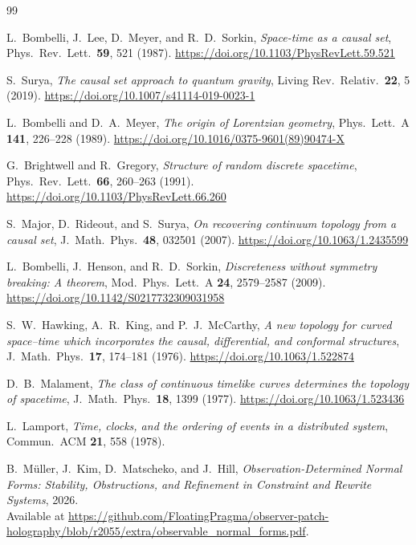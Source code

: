 \documentclass[11pt]{article}
\theoremstyle{remark}
\theoremstyle{plain}
\begin{document}
\begin{thebibliography}{99}

L.~Bombelli, J.~Lee, D.~Meyer, and R.~D.~Sorkin,
\emph{Space-time as a causal set},
Phys.\ Rev.\ Lett.\ \textbf{59}, 521 (1987).
\url{https://doi.org/10.1103/PhysRevLett.59.521}

S.~Surya,
\emph{The causal set approach to quantum gravity},
Living Rev.\ Relativ.\ \textbf{22}, 5 (2019).
\url{https://doi.org/10.1007/s41114-019-0023-1}

L.~Bombelli and D.~A.~Meyer,
\emph{The origin of Lorentzian geometry},
Phys.\ Lett.\ A \textbf{141}, 226--228 (1989).
\url{https://doi.org/10.1016/0375-9601(89)90474-X}

G.~Brightwell and R.~Gregory,
\emph{Structure of random discrete spacetime},
Phys.\ Rev.\ Lett.\ \textbf{66}, 260--263 (1991).
\url{https://doi.org/10.1103/PhysRevLett.66.260}

S.~Major, D.~Rideout, and S.~Surya,
\emph{On recovering continuum topology from a causal set},
J.\ Math.\ Phys.\ \textbf{48}, 032501 (2007).
\url{https://doi.org/10.1063/1.2435599}

L.~Bombelli, J.~Henson, and R.~D.~Sorkin,
\emph{Discreteness without symmetry breaking: A theorem},
Mod.\ Phys.\ Lett.\ A \textbf{24}, 2579--2587 (2009).
\url{https://doi.org/10.1142/S0217732309031958}

S.~W.~Hawking, A.~R.~King, and P.~J.~McCarthy,
\emph{A new topology for curved space--time which incorporates the causal,
differential, and conformal structures},
J.\ Math.\ Phys.\ \textbf{17}, 174--181 (1976).
\url{https://doi.org/10.1063/1.522874}

D.~B.~Malament,
\emph{The class of continuous timelike curves determines the topology of spacetime},
J.\ Math.\ Phys.\ \textbf{18}, 1399 (1977).
\url{https://doi.org/10.1063/1.523436}

L.~Lamport,
\emph{Time, clocks, and the ordering of events in a distributed system},
Commun.\ ACM \textbf{21}, 558 (1978).

B.~M\"uller, J.~Kim, D.~Matscheko, and J.~Hill,
\emph{Observation-Determined Normal Forms: Stability, Obstructions, and Refinement in Constraint
and Rewrite Systems},
2026.\\
Available at \url{https://github.com/FloatingPragma/observer-patch-holography/blob/r2055/extra/observable_normal_forms.pdf}.


\end{thebibliography}
\end{document}
